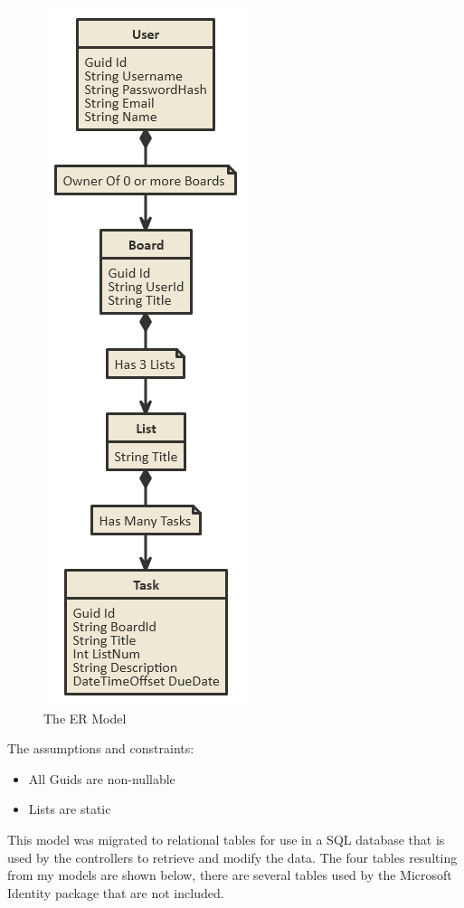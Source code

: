 \documentclass[letterpaper]{article}
\begin{document}
\begin{figure}[H]
  \centering
  \caption{The ER Model}
  \includegraphics[scale=0.5]{Images/ER}
\end{figure}

The assumptions and constraints:
\begin{itemize}
  \item All Guids are non-nullable
  \item Lists are static
\end{itemize}

This model was migrated to relational tables for use in a SQL database that is used by the controllers to retrieve and modify the data. The four tables resulting from my models are shown below, there are several tables used by the Microsoft Identity package that are not included.
\end{document}
